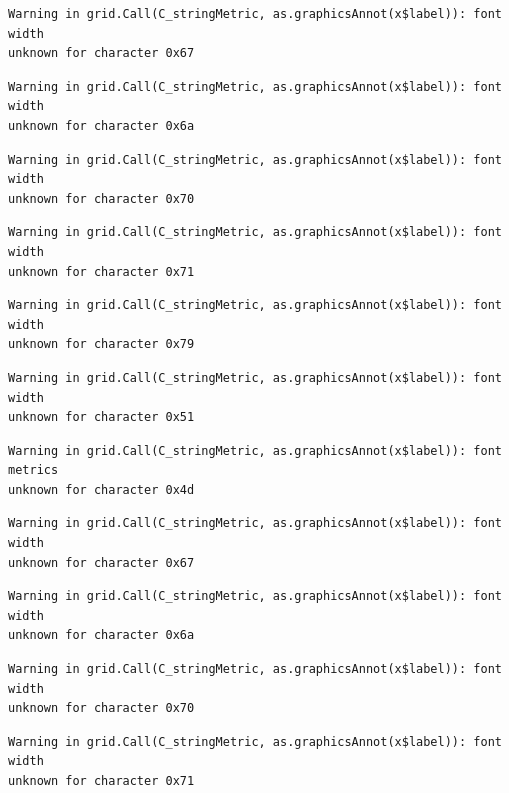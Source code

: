 \documentclass[
  letterpaper,
]{scrbook}
\begin{document}
\begin{verbatim}
Warning in grid.Call(C_stringMetric, as.graphicsAnnot(x$label)): font width
unknown for character 0x67
\end{verbatim}

\begin{verbatim}
Warning in grid.Call(C_stringMetric, as.graphicsAnnot(x$label)): font width
unknown for character 0x6a
\end{verbatim}

\begin{verbatim}
Warning in grid.Call(C_stringMetric, as.graphicsAnnot(x$label)): font width
unknown for character 0x70
\end{verbatim}

\begin{verbatim}
Warning in grid.Call(C_stringMetric, as.graphicsAnnot(x$label)): font width
unknown for character 0x71
\end{verbatim}

\begin{verbatim}
Warning in grid.Call(C_stringMetric, as.graphicsAnnot(x$label)): font width
unknown for character 0x79
\end{verbatim}

\begin{verbatim}
Warning in grid.Call(C_stringMetric, as.graphicsAnnot(x$label)): font width
unknown for character 0x51
\end{verbatim}

\begin{verbatim}
Warning in grid.Call(C_stringMetric, as.graphicsAnnot(x$label)): font metrics
unknown for character 0x4d
\end{verbatim}

\begin{verbatim}
Warning in grid.Call(C_stringMetric, as.graphicsAnnot(x$label)): font width
unknown for character 0x67
\end{verbatim}

\begin{verbatim}
Warning in grid.Call(C_stringMetric, as.graphicsAnnot(x$label)): font width
unknown for character 0x6a
\end{verbatim}

\begin{verbatim}
Warning in grid.Call(C_stringMetric, as.graphicsAnnot(x$label)): font width
unknown for character 0x70
\end{verbatim}

\begin{verbatim}
Warning in grid.Call(C_stringMetric, as.graphicsAnnot(x$label)): font width
unknown for character 0x71
\end{verbatim}
\end{document}
